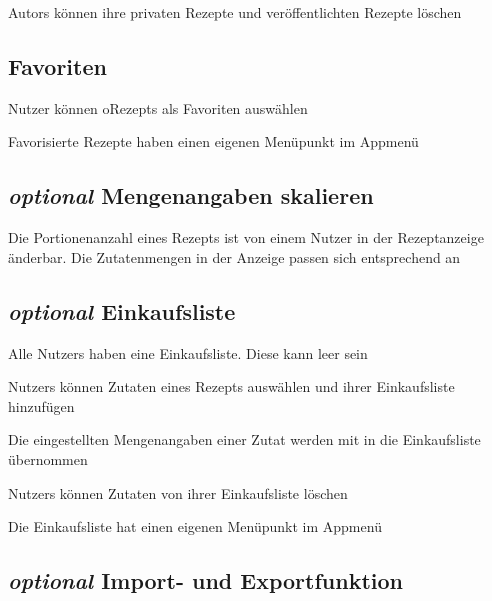 		\glspl{Autor} können ihre privaten Rezepte und veröffentlichten Rezepte löschen


	\subsection{Favoriten}
	
	Nutzer können \glspl{oRezept} als Favoriten auswählen

	Favorisierte Rezepte haben einen eigenen Menüpunkt im Appmenü
	
	
	\subsection{{\em optional} Mengenangaben skalieren}
	
		Die Portionenanzahl eines Rezepts ist von einem Nutzer in der Rezeptanzeige änderbar.
		Die Zutatenmengen in der Anzeige passen sich entsprechend an
	
	\subsection {{\em optional} Einkaufsliste}	
		Alle \glspl{Nutzer} haben eine Einkaufsliste. Diese kann leer sein
	
		\glspl{Nutzer} können Zutaten eines Rezepts auswählen und ihrer Einkaufsliste hinzufügen
	
		Die eingestellten Mengenangaben einer Zutat werden mit in die Einkaufsliste übernommen
	
		\glspl{Nutzer} können Zutaten von ihrer Einkaufsliste löschen
	
		Die Einkaufsliste hat einen eigenen Menüpunkt im Appmenü


	\subsection{{\em optional} Import- und Exportfunktion}
		
